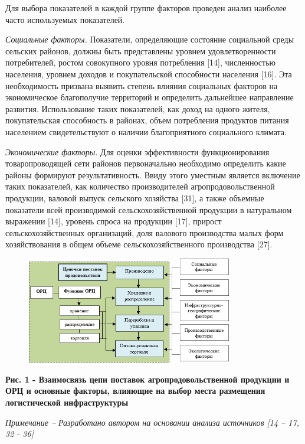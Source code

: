Для выбора показателей в каждой группе факторов проведен анализ наиболее
часто используемых показателей.

\emph{Социальные факторы.} Показатели, определяющие состояние социальной
среды сельских районов, должны быть представлены уровнем
удовлетворенности потребителей, ростом совокупного уровня потребления
{[}14{]}, численностью населения, уровнем доходов и покупательской
способности населения {[}16{]}. Эта необходимость призвана выявить
степень влияния социальных факторов на экономическое благополучие
территорий и определить дальнейшее направление развития. Использование
таких показателей, как доход на одного жителя, покупательская
способность в районах, объем потребления продуктов питания населением
свидетельствуют о наличии благоприятного социального климата.

\emph{Экономические факторы.} Для оценки эффективности функционирования
товаропроводящей сети районов первоначально необходимо определить какие
районы формируют результативность. Ввиду этого уместным является
включение таких показателей, как количество производителей
агропродовольственной продукции, валовой выпуск сельского хозяйства
{[}31{]}, а также объемные показатели всей производимой
сельскохозяйственной продукции в натуральном выражении {[}14{]}, уровень
спроса на продукции {[}17{]}, прирост сельскохозяйственных организаций,
доля валового производства малых форм хозяйствования в общем объеме
сельскохозяйственного производства {[}27{]}.

\begin{figure}[H]
	\centering
	\includegraphics[width=0.8\textwidth]{media/ekon2/image8}
	\caption*{}
\end{figure}


{\bfseries Рис. 1 - Взаимосвязь цепи поставок агропродовольственной
продукции и ОРЦ и основные факторы, влияющие на выбор места размещения
логистической инфраструктуры}

\emph{Примечание -- Разработано автором на основании анализа источников
{[}14 -- 17, 32 - 36{]}}

